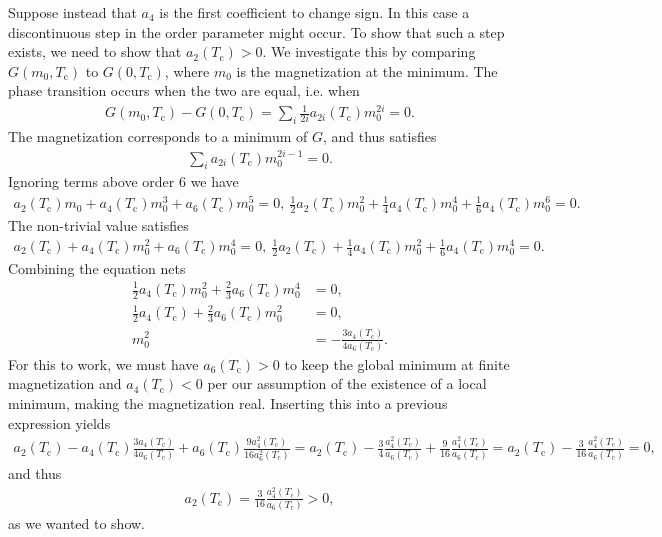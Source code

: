 Suppose instead that $a_{4}$ is the first coefficient to change sign. In this case a discontinuous step in the order parameter might occur. To show that such a step exists, we need to show that $a_{2}(T_{\text{c}}) > 0$. We investigate this by comparing $G(m_{0}, T_{\text{c}})$ to $G(0, T_{\text{c}})$, where $m_{0}$ is the magnetization at the minimum. The phase transition occurs when the two are equal, i.e. when
\begin{align*}
	G(m_{0}, T_{\text{c}}) - G(0, T_{\text{c}}) = \sum\limits_{i}\frac{1}{2i}a_{2i}(T_{\text{c}})m_{0}^{2i} = 0.
\end{align*}
The magnetization corresponds to a minimum of $G$, and thus satisfies
\begin{align*}
	\sum\limits_{i}a_{2i}(T_{\text{c}})m_{0}^{2i - 1} = 0.
\end{align*}
Ignoring terms above order $6$ we have
\begin{align*}
	a_{2}(T_{\text{c}})m_{0} + a_{4}(T_{\text{c}})m_{0}^{3} + a_{6}(T_{\text{c}})m_{0}^{5} = 0,\ \frac{1}{2}a_{2}(T_{\text{c}})m_{0}^{2} + \frac{1}{4}a_{4}(T_{\text{c}})m_{0}^{4} + \frac{1}{6}a_{4}(T_{\text{c}})m_{0}^{6} = 0.
\end{align*}
The non-trivial value satisfies
\begin{align*}
	a_{2}(T_{\text{c}}) + a_{4}(T_{\text{c}})m_{0}^{2} + a_{6}(T_{\text{c}})m_{0}^{4} = 0,\ \frac{1}{2}a_{2}(T_{\text{c}}) + \frac{1}{4}a_{4}(T_{\text{c}})m_{0}^{2} + \frac{1}{6}a_{4}(T_{\text{c}})m_{0}^{4} = 0.
\end{align*}
Combining the equation nets
\begin{align*}
	\frac{1}{2}a_{4}(T_{\text{c}})m_{0}^{2} + \frac{2}{3}a_{6}(T_{\text{c}})m_{0}^{4} &= 0, \\
	\frac{1}{2}a_{4}(T_{\text{c}}) + \frac{2}{3}a_{6}(T_{\text{c}})m_{0}^{2}          &= 0, \\
	m_{0}^{2}                                                                         &= -\frac{3a_{4}(T_{\text{c}})}{4a_{6}(T_{\text{c}})}.
\end{align*}
For this to work, we must have $a_{6}(T_{\text{c}}) > 0$ to keep the global minimum at finite magnetization and $a_{4}(T_{\text{c}}) < 0$ per our assumption of the existence of a local minimum, making the magnetization real. Inserting this into a previous expression yields
\begin{align*}
	a_{2}(T_{\text{c}}) - a_{4}(T_{\text{c}})\frac{3a_{4}(T_{\text{c}})}{4a_{6}(T_{\text{c}})} + a_{6}(T_{\text{c}})\frac{9a_{4}^{2}(T_{\text{c}})}{16a_{6}^{2}(T_{\text{c}})} = a_{2}(T_{\text{c}}) - \frac{3}{4}\frac{a_{4}^{2}(T_{\text{c}})}{a_{6}(T_{\text{c}})} + \frac{9}{16}\frac{a_{4}^{2}(T_{\text{c}})}{a_{6}(T_{\text{c}})} = a_{2}(T_{\text{c}}) - \frac{3}{16}\frac{a_{4}^{2}(T_{\text{c}})}{a_{6}(T_{\text{c}})} = 0,
\end{align*}
and thus
\begin{align*}
	a_{2}(T_{\text{c}}) = \frac{3}{16}\frac{a_{4}^{2}(T_{\text{c}})}{a_{6}(T_{\text{c}})} > 0,
\end{align*}
as we wanted to show.


